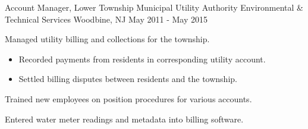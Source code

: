 \begin{cventries}
  \cventry
    {Account Manager, Lower Township Municipal Utility Authority} %
    {Environmental \& Technical Services} %
    {Woodbine, NJ} %
    {May 2011 - May 2015} %
    {
      \begin{cvitems} %
        \item {Managed utility billing and collections for the township.}
        \begin{itemize}
          \item {Recorded payments from residents in corresponding utility account.}
          \item {Settled billing disputes between residents and the township.}
        \end{itemize}
        \item {Trained new employees on position procedures for various accounts.}
        \item {Entered water meter readings and metadata into billing software.}
      \end{cvitems}
    }

\end{cventries}
